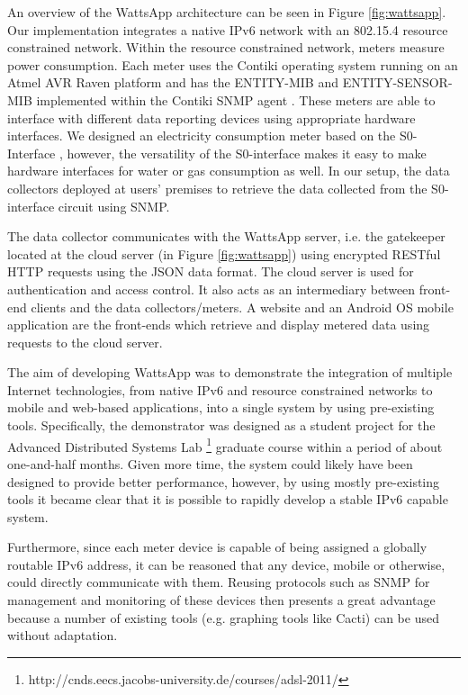 \documentclass[10pt, conference, compsocconf]{IEEEtran}
\begin{document}
An overview of the WattsApp architecture can be seen in Figure \ref{fig:wattsapp}.
Our implementation integrates a native IPv6 network with an 802.15.4
resource constrained network. Within the resource constrained network,
meters measure power consumption. Each meter uses the Contiki operating
system \cite{contiki-2} running on an Atmel AVR Raven platform and
has the ENTITY-MIB \cite{rfc4133} and ENTITY-SENSOR-MIB \cite{rfc3433}
implemented within the Contiki SNMP agent \cite{aims-snmp-contiki}.
These meters are able to interface with different data reporting devices
using appropriate hardware interfaces. We designed an electricity
consumption meter based on the S0-Interface \cite{iec62053-31}, however,
the versatility of the S0-interface makes it easy to make hardware
interfaces for water or gas consumption as well. In our setup, the
data collectors deployed at users' premises to retrieve the data collected
from the S0-interface circuit using SNMP.

The data collector communicates with the WattsApp server, i.e. the
gatekeeper located at the cloud server (in Figure \ref{fig:wattsapp})
using encrypted RESTful HTTP requests using the JSON data format.
The cloud server is used for authentication and access control. It
also acts as an intermediary between front-end clients and the data
collectors/meters. A website and an Android OS mobile application
are the front-ends which retrieve and display metered data using requests
to the cloud server.

The aim of developing WattsApp was to demonstrate the integration
of multiple Internet technologies, from native IPv6 and resource constrained
networks to mobile and web-based applications, into a single system
by using pre-existing tools. Specifically, the demonstrator was designed
as a student project for the Advanced Distributed Systems Lab%
\footnote{http://cnds.eecs.jacobs-university.de/courses/adsl-2011/%
} graduate course within a period of about one-and-half months. Given
more time, the system could likely have been designed to provide better
performance, however, by using mostly pre-existing tools it became
clear that it is possible to rapidly develop a stable IPv6 capable
system.

Furthermore, since each meter device is capable of being assigned
a globally routable IPv6 address, it can be reasoned that any device,
mobile or otherwise, could directly communicate with them. Reusing
protocols such as SNMP for management and monitoring of these devices
then presents a great advantage because a number of existing tools
(e.g. graphing tools like Cacti) can be used without adaptation.
\end{document}
